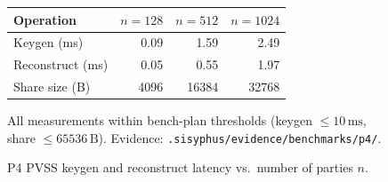 \begin{figure}[h]
\caption{P4 PVSS keygen and reconstruct latency vs.\ number of parties $n$.}
\label{fig:p4-bench}
\centering
\begin{tabular}{lrrr}
\hline
Operation & $n=128$ & $n=512$ & $n=1024$ \\
\hline
Keygen (ms)      & 0.09  & 1.59  & 2.49  \\
Reconstruct (ms) & 0.05  & 0.55  & 1.97  \\
Share size (B)   & 4096  & 16384 & 32768 \\
\hline
\end{tabular}

\smallskip
\noindent All measurements within bench-plan thresholds
(keygen $\leq 10\,\mathrm{ms}$, share $\leq 65536\,\mathrm{B}$).
Evidence: \texttt{.sisyphus/evidence/benchmarks/p4/}.
\end{figure}
